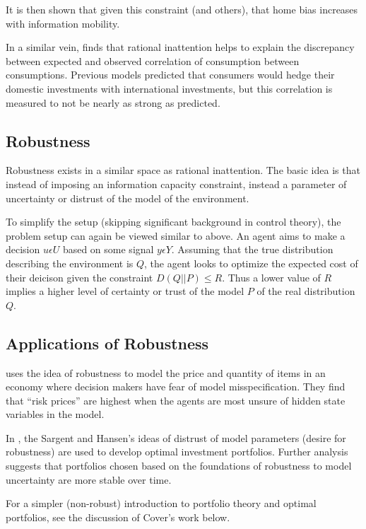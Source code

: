 \documentclass[10pt, twocolumn]{IEEEtran}
\begin{document}
It is then shown that given this constraint (and others), that home bias increases with information mobility.

In a similar vein, \cite{Li2017} finds that rational inattention helps to explain the discrepancy between expected and
observed correlation of consumption between consumptions. Previous models predicted that consumers would hedge their
domestic investments with international investments, but this correlation is measured to not be nearly as strong as
predicted.

\subsection{Robustness}
Robustness exists in a similar space as rational inattention. The basic idea is that instead of
imposing an information capacity constraint, instead a parameter of uncertainty or distrust of
the model of the environment.

To simplify the setup (skipping significant background in control theory), the problem setup can
again be viewed similar to above. An agent aims to make a decision $u \epsilon U$ based on some signal $y \epsilon Y$.
Assuming that the true distribution describing the environment is $Q$, the agent looks to optimize the expected cost of
their deicison given the constraint $D(Q||P) \le R$. Thus a lower value of $R$ implies a higher level of certainty or
trust of the model $P$ of the real distribution $Q$.

\subsection{Applications of Robustness}

\cite{sargent2015} uses the idea of robustness to model the price and quantity of items in an economy where decision
makers have fear of model misspecification. They find that ``risk prices'' are highest when the agents are most
unsure of hidden state variables in the model.

In \cite{robustPortfolio}, the Sargent and Hansen's ideas of distrust of model parameters (desire for robustness)
are used to develop optimal investment portfolios. Further analysis suggests that portfolios chosen based
on the foundations of robustness to model uncertainty are more stable over time.

For a simpler (non-robust) introduction to portfolio theory and optimal portfolios, see the discussion of Cover's
work below.
\end{document}
